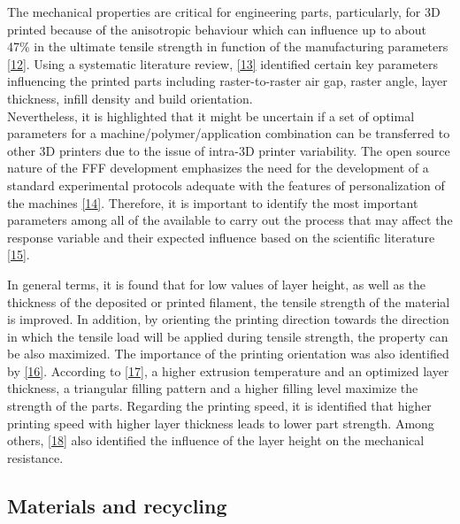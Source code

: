 \documentclass[conference,final,]{IEEEtran}
\begin{document}
The mechanical properties are critical for engineering parts,
particularly, for 3D printed because of the anisotropic behaviour which
can influence up to about 47\% in the ultimate tensile strength in
function of the manufacturing parameters
\protect\hyperlink{ref-Laureto2018}{{[}12{]}}. Using a systematic
literature review, \protect\hyperlink{ref-Popescu2018}{{[}13{]}}
identified certain key parameters influencing the printed parts
including raster-to-raster air gap, raster angle, layer thickness,
infill density and build orientation.\\
Nevertheless, it is highlighted that it might be uncertain if a set of
optimal parameters for a machine/polymer/application combination can be
transferred to other 3D printers due to the issue of intra-3D printer
variability. The open source nature of the FFF development emphasizes
the need for the development of a standard experimental protocols
adequate with the features of personalization of the machines
\protect\hyperlink{ref-CruzSanchez2014}{{[}14{]}}. Therefore, it is
important to identify the most important parameters among all of the
available to carry out the process that may affect the response variable
and their expected influence based on the scientific literature
\protect\hyperlink{ref-JaisinghSheoran2019}{{[}15{]}}.

In general terms, it is found that for low values of layer height, as
well as the thickness of the deposited or printed filament, the tensile
strength of the material is improved. In addition, by orienting the
printing direction towards the direction in which the tensile load will
be applied during tensile strength, the property can be also maximized.
The importance of the printing orientation was also identified by
\protect\hyperlink{ref-Yao2019}{{[}16{]}}. According to
\protect\hyperlink{ref-Alafaghani2018}{{[}17{]}}, a higher extrusion
temperature and an optimized layer thickness, a triangular filling
pattern and a higher filling level maximize the strength of the parts.
Regarding the printing speed, it is identified that higher printing
speed with higher layer thickness leads to lower part strength. Among
others, \protect\hyperlink{ref-Altan2018}{{[}18{]}} also identified the
influence of the layer height on the mechanical resistance.

\hypertarget{materials-and-recycling}{%
\subsection{Materials and recycling}\label{materials-and-recycling}}
\end{document}
